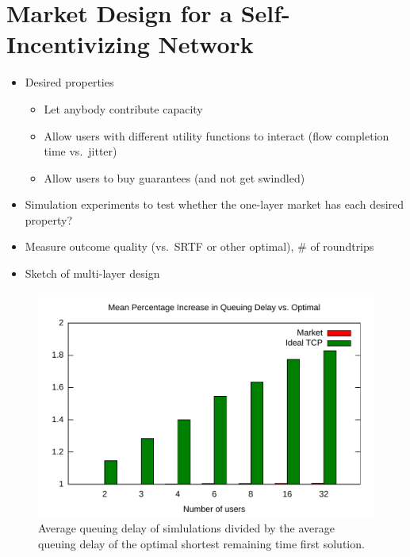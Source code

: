 \section{Market Design for a Self-Incentivizing Network}
\label{sec:designs}

\begin{itemize}

\item Desired properties

\begin{itemize}

\item Let anybody contribute capacity

\item Allow users with different utility functions to interact (flow completion time vs.~jitter)

\item Allow users to buy guarantees (and not get swindled)

\end{itemize}

\item Simulation experiments to test whether the one-layer market has each desired property?

\item Measure outcome quality (vs.~SRTF or other optimal), \# of roundtrips


\item Sketch of multi-layer design

\end{itemize}

\begin{figure}
\includegraphics[width=\columnwidth]{plots/delay_over_srtf.pdf}
\caption{Average queuing delay of simlulations divided by the average queuing delay of the optimal shortest remaining time first solution.}
\label{f:delay_over_srtf}
\end{figure}

